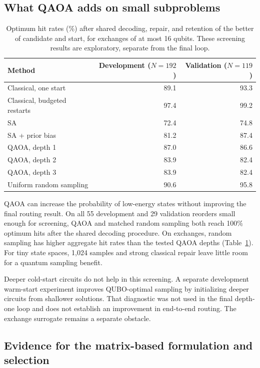 \documentclass[11pt,a4paper]{article}
\begin{document}
\subsection{What QAOA adds on small subproblems}

\begin{table}[tbp]
\centering\small
\caption{Optimum hit rates (\%) after shared decoding, repair, and retention
of the better of candidate and start, for exchanges of at most 16 qubits.
These screening results are exploratory, separate from the final loop.}
\label{tab:qaoa}
\begin{tabular}{@{}lrr@{}}
\toprule
Method & Development ($N=192$) & Validation ($N=119$)\\
\midrule
Classical, one start & 89.1 & 93.3\\
Classical, budgeted restarts & 97.4 & 99.2\\
SA & 72.4 & 74.8\\
SA + prior bias & 81.2 & 87.4\\
QAOA, depth 1 & 87.0 & 86.6\\
QAOA, depth 2 & 83.9 & 82.4\\
QAOA, depth 3 & 83.9 & 82.4\\
Uniform random sampling & 90.6 & 95.8\\
\bottomrule
\end{tabular}
\end{table}

QAOA can increase the probability of low-energy states without improving
the final routing result. On all 55 development and 29 validation reorders
small enough for screening, QAOA and matched random sampling both reach
100\% optimum hits after the shared decoding procedure. On exchanges,
random sampling has higher aggregate hit rates than the tested QAOA depths
(Table~\ref{tab:qaoa}). For tiny state spaces, 1,024 samples and strong
classical repair leave little room for a quantum sampling benefit.

Deeper cold-start circuits do not help in this screening. A separate
development warm-start experiment improves QUBO-optimal sampling by
initializing deeper circuits from shallower solutions. That diagnostic was
not used in the final depth-one loop and does not establish an improvement
in end-to-end routing. The exchange surrogate remains a separate obstacle.

\subsection{Evidence for the matrix-based formulation and selection}
\end{document}
